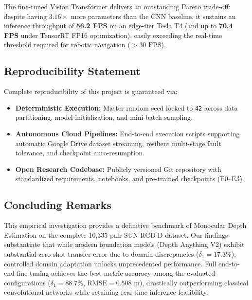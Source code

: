 \documentclass[twoside,final]{hcmut-report}
\begin{document}
The fine-tuned Vision Transformer delivers an outstanding Pareto trade-off: despite having $3.16\times$ more parameters than the CNN baseline, it sustains an inference throughput of \textbf{56.2 FPS} on an edge-tier Tesla T4 (and up to \textbf{70.4 FPS} under TensorRT FP16 optimization), easily exceeding the real-time threshold required for robotic navigation ($>30\text{ FPS}$).

\subsection{Reproducibility Statement}

Complete reproducibility of this project is guaranteed via:

\begin{itemize}

  \item \textbf{Deterministic Execution:} Master random seed locked to \texttt{42} across data partitioning, model initialization, and mini-batch sampling.

  \item \textbf{Autonomous Cloud Pipelines:} End-to-end execution scripts supporting automatic Google Drive dataset streaming, resilient multi-stage fault tolerance, and checkpoint auto-resumption.

  \item \textbf{Open Research Codebase:} Publicly versioned Git repository with standardized requirements, notebooks, and pre-trained checkpoints (E0--E3).

\end{itemize}

\subsection{Concluding Remarks}

This empirical investigation provides a definitive benchmark of Monocular Depth Estimation on the complete 10,335-pair SUN RGB-D dataset. Our findings substantiate that while modern foundation models (Depth Anything V2) exhibit substantial zero-shot transfer error due to domain discrepancies ($\delta_1 = 17.3\%$), controlled domain adaptation unlocks unprecedented performance. Full end-to-end fine-tuning achieves the best metric accuracy among the evaluated configurations ($\delta_1 = 88.7\%$, $\text{RMSE} = 0.508\text{ m}$), drastically outperforming classical convolutional networks while retaining real-time inference feasibility.
\end{document}
